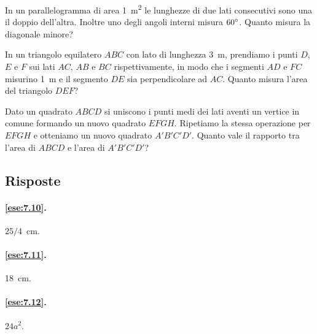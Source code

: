 \begin{multicols}{2}
\begin{esercizio}
\label{ese:7.111}
In un parallelogramma di area 1~m\textsuperscript{2} le lunghezze di due lati consecutivi sono una il doppio dell'altra. Inoltre uno degli angoli interni misura $60{}^{\circ}$. Quanto misura la diagonale minore?
\end{esercizio}

\begin{esercizio}
\label{ese:7.112}
In un triangolo equilatero $ABC$ con lato di lunghezza 3~m, prendiamo i punti $D$, $E$ e $F$ sui lati $AC$, $AB$ e $BC$ rispettivamente, in modo che i segmenti $AD$ e $FC$ misurino 1~m e il segmento $DE$ sia perpendicolare ad $AC$. Quanto misura l'area del triangolo $DEF$?
\end{esercizio}

	\centering

\begin{esercizio}
\label{ese:7.113}
Dato un quadrato $ABCD$ si uniscono i punti medi dei lati aventi un vertice in comune formando un nuovo quadrato $EFGH$. Ripetiamo la stessa operazione per $EFGH$ e otteniamo un nuovo quadrato $A'B'C'D'$. Quanto vale il rapporto tra l'area di $ABCD$ e l'area di $A'B'C'D'$?
\end{esercizio}

\end{multicols}


\subsection{Risposte}

\begingroup
\hypersetup{linkcolor=black}

\paragraph{\ref{ese:7.10}.}
$25/4$~cm.

\paragraph{\ref{ese:7.11}.}
18~cm.

\paragraph{\ref{ese:7.12}.}
$24a^2$.

